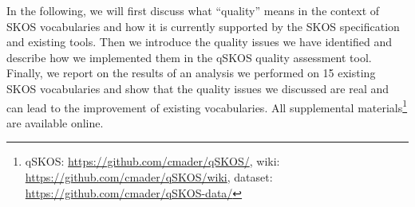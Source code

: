 In the following, we will first discuss what ``quality'' means in the context of SKOS vocabularies and how it is currently supported by the SKOS specification and existing tools. Then we introduce the quality issues we have identified and describe how we implemented them in the qSKOS quality assessment tool. Finally, we report on the results of an analysis we performed on 15 existing SKOS vocabularies and show that the quality issues we discussed are real and can lead to the improvement of existing vocabularies. All supplemental materials\footnote{qSKOS: \url{https://github.com/cmader/qSKOS/}, wiki: \url{https://github.com/cmader/qSKOS/wiki}, dataset: \url{https://github.com/cmader/qSKOS-data/}} are available online.
